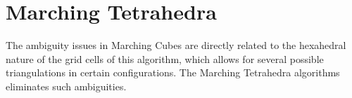\documentclass[12pt, a4paper, oneside]{book}
\theoremstyle{plain}
\newtheorem{theorem}{Theorem}[chapter]
\theoremstyle{definition}
\newtheorem{definition}[theorem]{Definition}
\theoremstyle{remark}
\theoremstyle{definition}
\begin{document}

\section{Marching Tetrahedra}

The ambiguity issues in Marching Cubes are directly related to the hexahedral nature of the grid cells of this algorithm, which allows for several possible triangulations in certain configurations. The Marching Tetrahedra algorithms eliminates such ambiguities.
\end{document}
